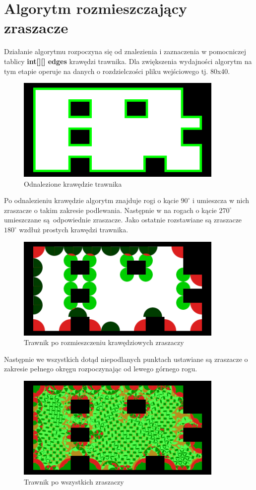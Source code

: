 \documentclass[a4paper]{article}
\begin{document}
\newpage
\section{Algorytm rozmieszczający zraszacze}
Działanie algorytmu rozpoczyna się od znalezienia i zaznaczenia w pomocniczej tablicy \textbf{int[][] edges} krawędzi trawnika. Dla zwiększenia wydajności algorytm na tym etapie operuje na danych o rozdzielczości pliku wejściowego tj. 80x40.

\begin{figure}[H]
    \includegraphics[width=10cm]{edges.png}
    \centering
    \caption{Odnalezione krawędzie trawnika}
\end{figure}

Po odnalezieniu krawędzie algorytm znajduje rogi o kącie \(90^{\circ}\) i umieszcza w nich zraszacze o takim zakresie podlewania. Następnie w na rogach o kącie \(270^{\circ}\) umieszczane są odpowiednie zraszacze. Jako ostatnie rozstawiane są zraszacze \(180^{\circ}\) wzdłuż prostych krawędzi trawnika.

\begin{figure}[H]
    \includegraphics[width=10cm]{edge_sprinklers.png}
    \centering
    \caption{Trawnik po rozmieszczeniu krawędziowych zraszaczy}
\end{figure}

Następnie we wszystkich dotąd niepodlanych punktach ustawiane są zraszacze o zakresie pełnego okręgu rozpoczynając od lewego górnego rogu.

\begin{figure}[H]
    \includegraphics[width=10cm]{all_sprinklers.png}
    \centering
    \caption{Trawnik po wszystkich zraszaczy}
\end{figure}
\end{document}
